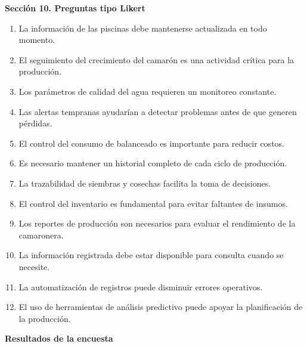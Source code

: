 \documentclass[11pt,a4paper]{article}
\begin{document}
\noindent\textbf{Sección 10. Preguntas tipo Likert}
\begin{enumerate}[resume]
  \item La información de las piscinas debe mantenerse actualizada en todo momento.
  \item El seguimiento del crecimiento del camarón es una actividad crítica para la producción.
  \item Los parámetros de calidad del agua requieren un monitoreo constante.
  \item Las alertas tempranas ayudarían a detectar problemas antes de que generen pérdidas.
  \item El control del consumo de balanceado es importante para reducir costos.
  \item Es necesario mantener un historial completo de cada ciclo de producción.
  \item La trazabilidad de siembras y cosechas facilita la toma de decisiones.
  \item El control del inventario es fundamental para evitar faltantes de insumos.
  \item Los reportes de producción son necesarios para evaluar el rendimiento de la camaronera.
  \item La información registrada debe estar disponible para consulta cuando se necesite.
  \item La automatización de registros puede disminuir errores operativos.
  \item El uso de herramientas de análisis predictivo puede apoyar la planificación de la producción.
\end{enumerate}

\bigskip

\noindent\textbf{Resultados de la encuesta}

\renewcommand{\arraystretch}{1.2}
\setlength{\tabcolsep}{4pt} %
\end{document}
